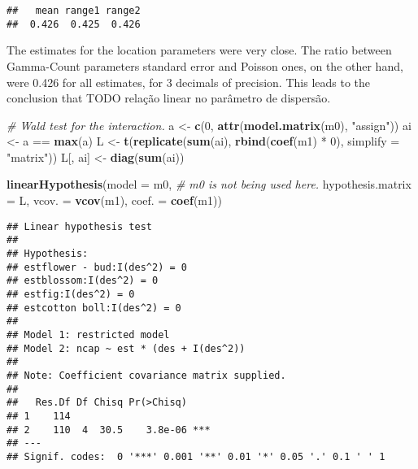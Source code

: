 \documentclass[9pt,a5paper,]{book}
\newenvironment{Shaded}{}{}
\newcommand{\KeywordTok}[1]{\textbf{{#1}}}
\newcommand{\DataTypeTok}[1]{\underline{{#1}}}
\newcommand{\DecValTok}[1]{{#1}}
\newcommand{\StringTok}[1]{{#1}}
\newcommand{\CommentTok}[1]{\textit{{#1}}}
\newcommand{\NormalTok}[1]{{#1}}
\renewenvironment{Shaded}{\color{inputcolor}}{}
\renewcommand{\DataTypeTok}[1]{{#1}}
\theoremstyle{definition}
\theoremstyle{definition}
\theoremstyle{remark}
\begin{document}
\begin{Shaded}
\end{Shaded}

\begin{verbatim}
##   mean range1 range2 
##  0.426  0.425  0.426
\end{verbatim}

The estimates for the location parameters were very close. The ratio
between Gamma-Count parameters standard error and Poisson ones, on the
other hand, were 0.426 for all estimates, for 3 decimals of precision.
This leads to the conclusion that TODO relação linear no parâmetro de
dispersão.

\begin{Shaded}
\begin{Highlighting}[]
\CommentTok{# Wald test for the interaction.}
\NormalTok{a <-}\StringTok{ }\KeywordTok{c}\NormalTok{(}\DecValTok{0}\NormalTok{, }\KeywordTok{attr}\NormalTok{(}\KeywordTok{model.matrix}\NormalTok{(m0), }\StringTok{"assign"}\NormalTok{))}
\NormalTok{ai <-}\StringTok{ }\NormalTok{a ==}\StringTok{ }\KeywordTok{max}\NormalTok{(a)}
\NormalTok{L <-}\StringTok{ }\KeywordTok{t}\NormalTok{(}\KeywordTok{replicate}\NormalTok{(}\KeywordTok{sum}\NormalTok{(ai), }\KeywordTok{rbind}\NormalTok{(}\KeywordTok{coef}\NormalTok{(m1) *}\StringTok{ }\DecValTok{0}\NormalTok{), }\DataTypeTok{simplify =} \StringTok{"matrix"}\NormalTok{))}
\NormalTok{L[, ai] <-}\StringTok{ }\KeywordTok{diag}\NormalTok{(}\KeywordTok{sum}\NormalTok{(ai))}

\KeywordTok{linearHypothesis}\NormalTok{(}\DataTypeTok{model =} \NormalTok{m0, }\CommentTok{# m0 is not being used here.}
                 \DataTypeTok{hypothesis.matrix =} \NormalTok{L,}
                 \DataTypeTok{vcov. =} \KeywordTok{vcov}\NormalTok{(m1),}
                 \DataTypeTok{coef. =} \KeywordTok{coef}\NormalTok{(m1))}
\end{Highlighting}
\end{Shaded}

\begin{verbatim}
## Linear hypothesis test
## 
## Hypothesis:
## estflower - bud:I(des^2) = 0
## estblossom:I(des^2) = 0
## estfig:I(des^2) = 0
## estcotton boll:I(des^2) = 0
## 
## Model 1: restricted model
## Model 2: ncap ~ est * (des + I(des^2))
## 
## Note: Coefficient covariance matrix supplied.
## 
##   Res.Df Df Chisq Pr(>Chisq)    
## 1    114                        
## 2    110  4  30.5    3.8e-06 ***
## ---
## Signif. codes:  0 '***' 0.001 '**' 0.01 '*' 0.05 '.' 0.1 ' ' 1
\end{verbatim}
\end{document}
